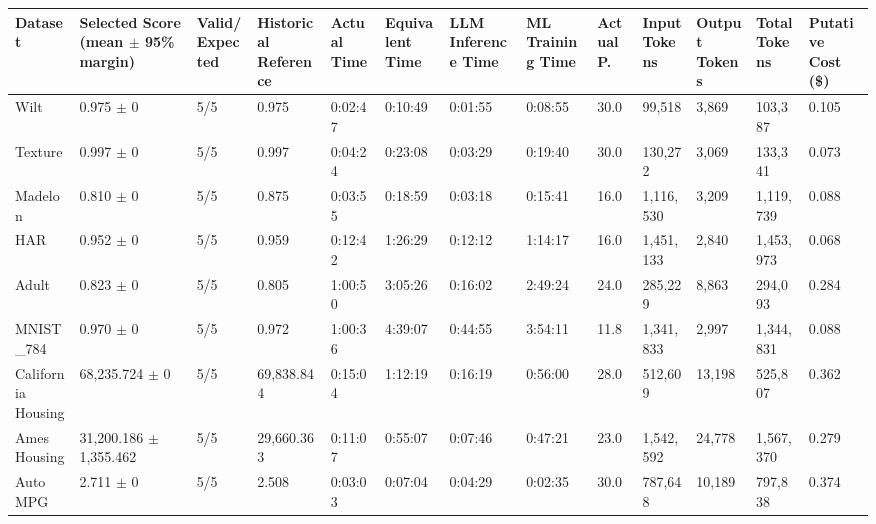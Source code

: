 \begin{tabular}{lllllllllllll}
\hline
Dataset & Selected Score (mean \ensuremath{\pm} 95\% margin) & Valid/Expected & Historical Reference & Actual Time & Equivalent Time & LLM Inference Time & ML Training Time & Actual P. & Input Tokens & Output Tokens & Total Tokens & Putative Cost (\$) \\
\hline
Wilt & 0.975 \ensuremath{\pm} 0 & 5/5 & 0.975 & 0:02:47 & 0:10:49 & 0:01:55 & 0:08:55 & 30.0 & 99,518 & 3,869 & 103,387 & 0.105 \\
Texture & 0.997 \ensuremath{\pm} 0 & 5/5 & 0.997 & 0:04:24 & 0:23:08 & 0:03:29 & 0:19:40 & 30.0 & 130,272 & 3,069 & 133,341 & 0.073 \\
Madelon & 0.810 \ensuremath{\pm} 0 & 5/5 & 0.875 & 0:03:55 & 0:18:59 & 0:03:18 & 0:15:41 & 16.0 & 1,116,530 & 3,209 & 1,119,739 & 0.088 \\
HAR & 0.952 \ensuremath{\pm} 0 & 5/5 & 0.959 & 0:12:42 & 1:26:29 & 0:12:12 & 1:14:17 & 16.0 & 1,451,133 & 2,840 & 1,453,973 & 0.068 \\
Adult & 0.823 \ensuremath{\pm} 0 & 5/5 & 0.805 & 1:00:50 & 3:05:26 & 0:16:02 & 2:49:24 & 24.0 & 285,229 & 8,863 & 294,093 & 0.284 \\
MNIST\_784 & 0.970 \ensuremath{\pm} 0 & 5/5 & 0.972 & 1:00:36 & 4:39:07 & 0:44:55 & 3:54:11 & 11.8 & 1,341,833 & 2,997 & 1,344,831 & 0.088 \\
California Housing & 68,235.724 \ensuremath{\pm} 0 & 5/5 & 69,838.844 & 0:15:04 & 1:12:19 & 0:16:19 & 0:56:00 & 28.0 & 512,609 & 13,198 & 525,807 & 0.362 \\
Ames Housing & 31,200.186 \ensuremath{\pm} 1,355.462 & 5/5 & 29,660.363 & 0:11:07 & 0:55:07 & 0:07:46 & 0:47:21 & 23.0 & 1,542,592 & 24,778 & 1,567,370 & 0.279 \\
Auto MPG & 2.711 \ensuremath{\pm} 0 & 5/5 & 2.508 & 0:03:03 & 0:07:04 & 0:04:29 & 0:02:35 & 30.0 & 787,648 & 10,189 & 797,838 & 0.374 \\
\hline
\end{tabular}
